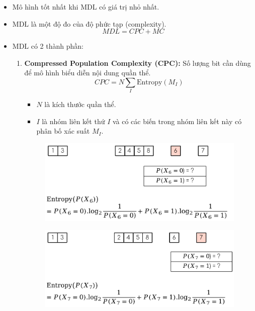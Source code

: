 \documentclass{book}
\begin{document}
            \begin{itemize}
                \item Mô hình tốt nhất khi MDL có giá trị nhỏ nhất.
                \item MDL là một độ đo của độ phức tạp (complexity).
                \[
                MDL=CPC+MC
                \]
                \item MDL có 2 thành phần:
                \begin{enumerate}
                    \item \textbf{Compressed Population Complexity (CPC):} Số lượng bit cần dùng để mô hình biểu diễn nội dung quần thể.
                    \[
                    CPC = N \sum_{I} \text{Entropy}(M_I)
                    \]
                    \begin{itemize}
                        \item $N$ là kích thước quần thể.
                        \item $I$ là nhóm liên kết thứ $I$ và có các biến trong nhóm liên kết này có phân bố xác suất $M_I$.
                    \end{itemize}
                    \begin{figure}[H]
                        \centering
                        \includegraphics[width=0.7\linewidth]{images/cpc1.png}
                        \label{fig:cpc1}
                    \end{figure}
                    \begin{figure}[H]
                        \centering
                        \includegraphics[width=0.7\linewidth]{images/cpc2.png}
                        \label{fig:cpc2}

\end{figure}
\end{enumerate}
\end{itemize}
\end{document}
